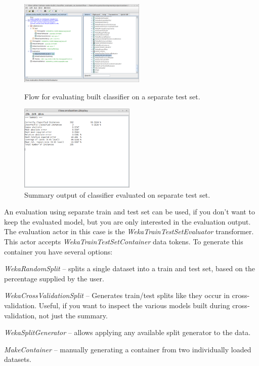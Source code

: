 \begin{figure}[ht]
  \begin{minipage}[t]{0.5\linewidth}
    \centering
    \includegraphics[width=6.0cm]{images/basic-testseteval-flow.png}
    \caption{Flow for evaluating built classifier on a separate test set.}
    \label{basic-testseteval-flow}
  \end{minipage}
  \hspace{0.5cm}
  \begin{minipage}[t]{0.5\linewidth}
    \centering
    \includegraphics[width=5.5cm]{images/basic-testseteval-output.png}
    \caption{Summary output of classifier evaluated on separate test set.}
    \label{basic-testseteval-output}
  \end{minipage}
\end{figure}

An evaluation using separate train and test set can be used, if you don't want
to keep the evaluated model, but you are only interested in the evaluation
output. The evaluation actor in this case is the
\textit{WekaTrainTestSetEvaluator} transformer. This actor accepts
\textit{WekaTrainTestSetContainer} data tokens. To generate this container you
have several options:
\begin{tight_itemize}
	\item \textit{WekaRandomSplit} -- splits a single dataset into a train and test
	set, based on the percentage supplied by the user.
	\item \textit{WekaCrossValidationSplit} -- Generates train/test splits like
	they occur in cross-validation. Useful, if you want to inspect the various models
	built during cross-validation, not just the summary.
	\item \textit{WekaSplitGenerator} -- allows applying any available split generator to the data.
	\item \textit{MakeContainer} -- manually generating a container from two
	individually loaded datasets.
\end{tight_itemize}

